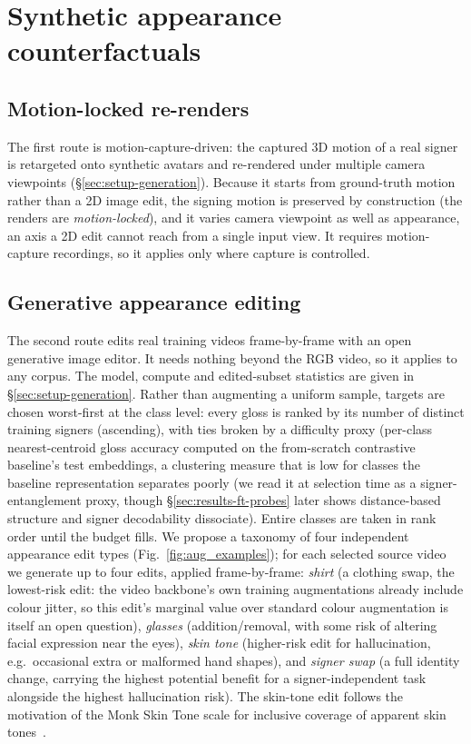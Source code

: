 \section{Synthetic appearance counterfactuals}
\label{sec:method-diffusion}

\subsection{Motion-locked re-renders}
The first route is motion-capture-driven: the captured 3D motion of a real
signer is retargeted onto synthetic avatars and re-rendered under multiple
camera viewpoints (\S\ref{sec:setup-generation}). Because it starts from
ground-truth motion rather than a 2D image edit, the signing motion is
preserved by construction (the renders are \emph{motion-locked}), and it
varies camera viewpoint as well as appearance, an axis a 2D edit cannot
reach from a single input view. It requires motion-capture recordings, so
it applies only where capture is controlled.

\subsection{Generative appearance editing}
The second route edits real training videos frame-by-frame with an open
generative image editor. It needs nothing beyond the RGB video, so it
applies to any corpus. The model, compute and edited-subset statistics are
given in \S\ref{sec:setup-generation}.
Rather than
augmenting a uniform sample, targets are chosen worst-first
at the class level: every gloss is ranked by its number of distinct training
signers (ascending), with ties broken by a difficulty proxy (per-class
nearest-centroid gloss accuracy computed on the from-scratch contrastive
baseline's test embeddings,
a clustering measure that is low for classes the baseline representation
separates poorly (we read it at selection time as a signer-entanglement
proxy, though \S\ref{sec:results-ft-probes} later shows distance-based
structure and signer decodability dissociate). Entire classes are taken in rank order until the budget fills.
We propose a taxonomy of four independent appearance edit types
(Fig.~\ref{fig:aug_examples}); for each
selected source video we generate up to four edits, applied frame-by-frame:
\emph{shirt} (a clothing swap, the lowest-risk edit: the video backbone's own training
augmentations already include colour jitter, so this edit's marginal value
over standard colour augmentation is itself an open question), \emph{glasses}
(addition/removal, with some risk of altering facial expression near the
eyes), \emph{skin tone} (higher-risk edit for hallucination, e.g.\
occasional extra or malformed hand shapes), and \emph{signer swap} (a full
identity change, carrying the highest potential benefit for a
signer-independent task alongside the highest hallucination risk).
The skin-tone edit follows the motivation of the Monk Skin Tone scale
for inclusive coverage of apparent skin
tones~\cite{heldrethWhichSkinTone2024,
schumannConsensusSubjectivitySkin2023}.

